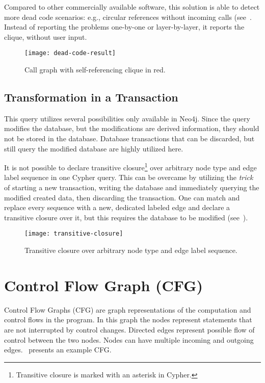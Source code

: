 Compared to other commercially available software, this solution is able to detect more dead code scenarios: e.g., circular references without incoming calls (see~. Instead of reporting the problems one-by-one or layer-by-layer, it reports the clique, without user input.

\begin{figure}[htbp]
  \centering
  \texttt{[image: dead-code-result]}
  \caption{Call graph with self-referencing clique in red.}
  \label{fig:dead-code-result}
\end{figure}

\subsection{Transformation in a Transaction}
This query utilizes several possibilities only available in Neo4j. Since the query modifies the database, but the modifications are derived information, they should not be stored in the database. Database transactions that can be discarded, but still query the modified database are highly utilized here.

It is not possible to declare transitive closure\footnote{Transitive closure is marked with an asterisk in Cypher.} over arbitrary node type and edge label sequence in one Cypher query. This can be overcame by utilizing the \emph{trick} of starting a new transaction, writing the database and immediately querying the modified created data, then discarding the transaction. One can match and replace every sequence with a new, dedicated labeled edge and declare a transitive closure over it, but this requires the database to be modified (see~).

\begin{figure}[htbp]
  \centering
  \texttt{[image: transitive-closure]}
  \caption{Transitive closure over arbitrary node type and edge label sequence.}
  \label{fig:transitive-closure}
\end{figure}


\section{Control Flow Graph (CFG)}
Control Flow Graphs (CFG) are graph representations of the computation and control flows in the program. In this graph the nodes represent statements that are not interrupted by control changes. Directed edges represent possible flow of control between the two nodes. Nodes can have multiple incoming and outgoing edges.~\cite{IntroductionToCompilers}
 presents an example CFG.

